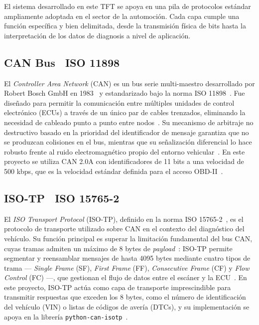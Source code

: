 El sistema desarrollado en este TFT se apoya en una pila de protocolos estándar 
ampliamente adoptada en el sector de la automoción. Cada capa cumple una función 
específica y bien delimitada, desde la transmisión física de bits hasta la 
interpretación de los datos de diagnosis a nivel de aplicación.


\subsection{CAN Bus \textemdash\ ISO 11898}

El \textit{Controller Area Network} (CAN) es un bus serie multi-maestro desarrollado 
por Robert Bosch GmbH en 1983~\cite{Bosch91-can} y estandarizado bajo la norma 
ISO 11898~\cite{ISO11898-1-15}. Fue diseñado para permitir la comunicación entre 
múltiples unidades de control electrónico (ECUs) a través de un único par de cables 
trenzados, eliminando la necesidad de cableado punto a punto entre 
nodos~\cite{Bosch91-can}. Su mecanismo de arbitraje no destructivo basado en la 
prioridad del identificador de mensaje garantiza que no se produzcan colisiones en el 
bus, mientras que su señalización diferencial lo hace robusto frente al ruido 
electromagnético propio del entorno vehicular~\cite{ISO11898-1-15}. En este proyecto 
se utiliza CAN 2.0A con identificadores de 11 bits a una velocidad de 500 kbps, que 
es la velocidad estándar definida para el acceso OBD-II~\cite{SAE-J1979-12}.


\subsection{ISO-TP \textemdash\ ISO 15765-2}

El \textit{ISO Transport Protocol} (ISO-TP), definido en la norma 
ISO 15765-2~\cite{ISO15765-2-16}, es el protocolo de transporte utilizado sobre CAN 
en el contexto del diagnóstico del vehículo. Su función principal es superar la 
limitación fundamental del bus CAN, cuyas tramas admiten un máximo de 8 bytes de 
\textit{payload}~\cite{ISO11898-1-15}: ISO-TP permite segmentar y reensamblar 
mensajes de hasta 4095 bytes mediante cuatro tipos de trama --- \textit{Single Frame} 
(SF), \textit{First Frame} (FF), \textit{Consecutive Frame} (CF) y \textit{Flow 
Control} (FC) ---, que gestionan el flujo de datos entre el escáner y la 
ECU~\cite{ISO15765-2-16}. En este proyecto, ISO-TP actúa como capa de transporte 
imprescindible para transmitir respuestas que exceden los 8 bytes, como el número de 
identificación del vehículo (VIN) o listas de códigos de avería (DTCs), y su 
implementación se apoya en la librería 
\texttt{python-can-isotp}~\cite{Menager23-isotp}.


